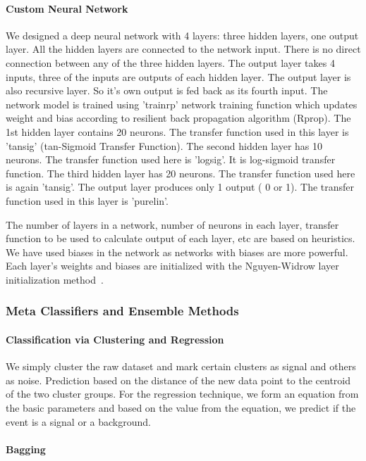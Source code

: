 \paragraph{Custom Neural Network}  We designed a deep neural network with 4 layers: three hidden layers, one output layer. All the hidden layers are connected to the network input.  There is no direct connection between any of the three hidden layers. The output layer takes 4 inputs, three of the inputs are outputs of each hidden layer. The output layer is also recursive layer. So it's own output is fed back as its fourth input. The network model is trained using 'trainrp' network training function which updates weight and bias according to resilient back propagation algorithm (Rprop).
The 1st hidden layer contains 20 neurons. The transfer function used in this layer is 'tansig' (tan-Sigmoid Transfer Function). The second hidden layer has 10 neurons. The transfer function used here is 'logsig'. It is log-sigmoid transfer function. The third hidden layer has 20 neurons. The transfer function used here is again 'tansig'.  The output layer produces only 1 output ( 0 or 1). The transfer function used in this layer is 'purelin'.


The number of layers in a network, number of neurons in each layer, transfer function to be used to calculate output of each layer, etc are based on heuristics. We have used biases in the network as networks with biases are more powerful. Each layer's weights and biases are initialized with the Nguyen-Widrow layer initialization method~\cite{NN-Speed}.




\subsubsection{Meta Classifiers and Ensemble Methods}

\paragraph{Classification via Clustering and Regression}

We simply cluster the raw dataset and mark certain clusters as signal and others as noise. Prediction based on the distance of the new data point to the centroid of the two cluster groups.  For the regression technique, we form an equation from the basic parameters and based on the value from the equation, we predict if the event is a signal or a background.

\paragraph{Bagging}


